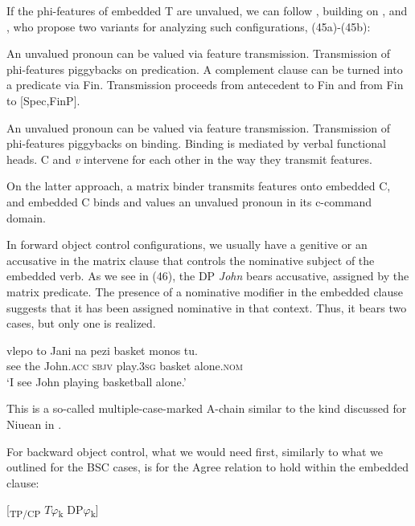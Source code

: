 \documentclass[output=paper]{langsci/langscibook}
\begin{document}
If the phi-features of embedded T are unvalued, we can follow \citet{Grano2016}, building on \citet{Kratzer2009}, and \citet{Landau2015}, who propose two variants for analyzing such configurations, (45a)-(45b):


\ea%
    \label{ex:alexiadou:52}
    \ea
    \begin{xlisti}
    \ex An unvalued pronoun can be valued via feature transmission.
    \ex Transmission of phi-features piggybacks on predication.
    \ex A complement clause can be turned into a predicate via Fin.
    \ex Transmission proceeds from antecedent to Fin and from Fin to [Spec,FinP].
    \end{xlisti}
    \ex
    \begin{xlisti}
    \ex An unvalued pronoun can be valued via feature transmission.
    \ex Transmission of phi-features piggybacks on binding.
    \ex Binding is mediated by verbal functional heads.
    \ex C and \textit{v} intervene for each other in the way they transmit features.
    \end{xlisti}
    \z
\z

On the latter approach, a matrix binder transmits features onto embedded C, and embedded C binds and values an unvalued pronoun in its c-command domain.

In forward object control configurations, we usually have a genitive or an accusative in the matrix clause that controls the nominative subject of the embedded verb. As we see in (46), the DP \textit{John} bears accusative, assigned by the matrix predicate. The presence of a nominative modifier in the embedded clause suggests that it has been assigned nominative in that context. Thus, it bears two cases, but only one is realized.

\ea%
    \label{ex:alexiadou:53}
    \gll vlepo to    Jani        na   pezi        basket  {monos tu}.\\
         see     the John.\textsc{acc} \textsc{sbjv} play.\textsc{3sg} basket  alone.\textsc{nom}\\
    \glt ‘I see John playing basketball alone.’
    \z

This is a so-called multiple-case-marked A-chain similar to the kind discussed for Niuean in \citet[67]{Bejar1999}.

For backward object control, what we would need first, similarly to what we outlined for the BSC cases, is for the Agree relation to hold within the embedded clause:

\ea%
    \label{ex:alexiadou:54}
    \textsubscript{} [\textsubscript{TP/CP}    $T\varphi $\textsubscript{k}    DP$\varphi $\textsubscript{k}]  
\z
 
\end{document}
